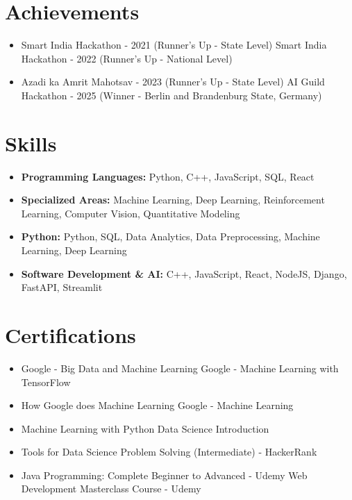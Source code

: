 \documentclass[a4paper,10pt]{article}
\begin{document}
\section*{Achievements}
\begin{itemize}
\item Smart India Hackathon - 2021 (Runner's Up - State Level) \hfill Smart India Hackathon - 2022 (Runner's Up - National Level)
\item Azadi ka Amrit Mahotsav - 2023 (Runner's Up - State Level) \hfill AI Guild Hackathon - 2025 (Winner - Berlin and Brandenburg State, Germany)
\end{itemize}

\section*{Skills}
\begin{itemize}
  \item \textbf{Programming Languages:} Python, C++, JavaScript, SQL, React
  \item \textbf{Specialized Areas:} Machine Learning, Deep Learning, Reinforcement Learning, Computer Vision, Quantitative Modeling
  \item \textbf{Python:} Python, SQL, Data Analytics, Data Preprocessing, Machine Learning, Deep Learning
  \item \textbf{Software Development \& AI:} C++, JavaScript, React, NodeJS, Django, FastAPI, Streamlit
\end{itemize}

\section*{Certifications}
\begin{itemize}
\item Google - Big Data and Machine Learning \hfill Google - Machine Learning with TensorFlow
\item How Google does Machine Learning \hfill Google - Machine Learning
\item Machine Learning with Python \hfill Data Science Introduction
\item Tools for Data Science \hfill Problem Solving (Intermediate) - HackerRank
\item Java Programming: Complete Beginner to Advanced - Udemy \hfill Web Development Masterclass Course - Udemy
\end{itemize}
\end{document}
